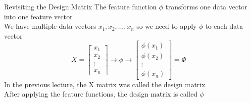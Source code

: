 \documentclass[aspectratio=169]{../latex_main/tntbeamer}  %
\begin{document}
	
	
	\begin{frame}[c]{Revisiting the Design Matrix}
	    The feature function $\phi$ transforms one data vector into one feature vector\\
	    \bigskip
	    We have multiple data vectors $x_1,x_2,...,x_n$ so we need to apply $\phi$ to each data vector\\
        \begin{equation*}
            X = \left[\begin{array}{c}
                 x_1\\
                 x_2\\
                 \vdots\\
                 x_n
            \end{array}\right] \rightarrow \phi \rightarrow \left[\begin{array}{c}
                 \phi(x_1)\\
                 \phi(x_2)\\
                 \vdots\\
                 \phi(x_n)
            \end{array}\right] = \Phi
        \end{equation*}
        In the previous lecture, the X matrix was called the design matrix\\
        After applying the feature functions, the design matrix is called $\phi$
	\end{frame}
\end{document}
